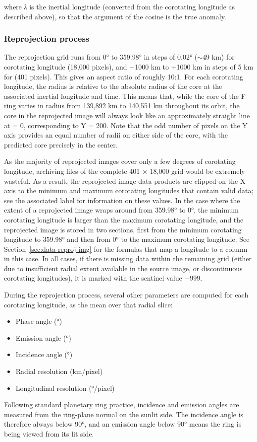 \noindent where \textit{λ} is the inertial longitude (converted from the corotating longitude as described above), so that the argument of the cosine is the true anomaly.


\subsubsection{Reprojection process}
\label{sec:reprojection-process}

The reprojection grid runs from 0° to 359.98° in steps of 0.02° ($\sim$49 km) for corotating longitude (18,000 pixels), and −1000 km to +1000 km in steps of 5 km for \dr{} (401 pixels). This gives an aspect ratio of roughly 10:1. For each corotating longitude, the radius is relative to the absolute radius of the core at the associated inertial longitude and time. This means that, while the core of the F ring varies in radius from 139,892 km to 140,551 km throughout its orbit, the core in the reprojected image will always look like an approximately straight line at \dr{} = 0, corresponding to Y = 200. Note that the odd number of pixels on the Y axis provides an equal number of radii on either side of the core, with the predicted core precisely in the center.

As the majority of reprojected images cover only a few degrees of corotating longitude, archiving files of the complete 401 × 18,000 grid would be extremely wasteful. As a result, the reprojected image data products are clipped on the X axis to the minimum and maximum corotating longitudes that contain valid data; see the associated label for information on these values. In the case where the extent of a reprojected image wraps around from 359.98° to 0°, the minimum corotating longitude is larger than the maximum corotating longitude, and the reprojected image is stored in two sections, first from the minimum corotating longitude to 359.98° and then from 0° to the maximum corotating longitude. See Section~\ref{sec:data-reproj-img} for the formulas that map a longitude to a column in this case. In all cases, if there is missing data within the remaining grid (either due to insufficient radial extent available in the source image, or discontinuous corotating longitudes), it is marked with the sentinel value −999.

During the reprojection process, several other parameters are computed for each corotating longitude, as the mean over that radial slice:

\begin{itemize}
\item Phase angle (°)
\item Emission angle (°)
\item Incidence angle (°)
\item Radial resolution (km/pixel)
\item Longitudinal resolution (°/pixel)
\end{itemize}
Following standard planetary ring practice, incidence and emission angles are measured from the ring-plane normal on the sunlit side. The incidence angle is therefore always below 90°, and an emission angle below 90° means the ring is being viewed from its lit side.

